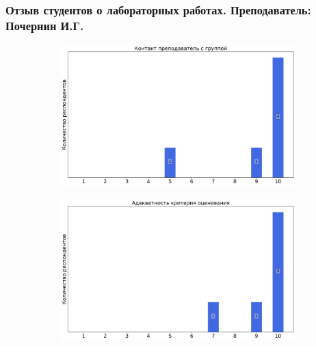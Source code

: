         
        \subsubsection{Отзыв студентов о лабораторных работах. Преподаватель: Почернин И.Г.}
            \begin{figure}[H]
                \centering
                \begin{subfigure}[b]{0.45\textwidth}
                    \centering
                    \includegraphics[width=\textwidth]{images/3 course/Общая физика - квантовая физика/labniks-marks-Почернин И.Г.-0.png}
                \end{subfigure}
                \begin{subfigure}[b]{0.45\textwidth}
                    \centering
                    \includegraphics[width=\textwidth]{images/3 course/Общая физика - квантовая физика/labniks-marks-Почернин И.Г.-1.png}
                \end{subfigure}
                \begin{subfigure}[b]{0.45\textwidth}

\end{subfigure}
\end{figure}
